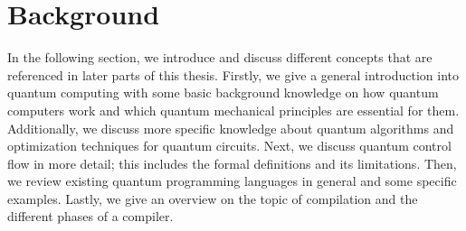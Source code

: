 \chapter{Background}
\label{ch:background}
In the following section, we introduce and discuss different concepts that are referenced in later parts of this thesis. Firstly, we give a general introduction into quantum computing with some basic background knowledge on how quantum computers work and which quantum mechanical principles are essential for them. Additionally, we discuss more specific knowledge about quantum algorithms and optimization techniques for quantum circuits. Next, we discuss quantum control flow in more detail; this includes the formal definitions and its limitations. Then, we review existing quantum programming languages in general and some specific examples. Lastly, we give an overview on the topic of compilation and the different phases of a compiler. 







